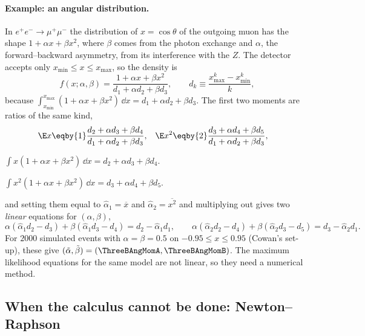 \paragraph{Example: an angular distribution.}
In $e^+e^-\to\mu^+\mu^-$ the distribution of $x=\cos\theta$ of the outgoing
muon has the shape $1+\alpha x+\beta x^2$, where $\beta$ comes from the
photon exchange and $\alpha$, the forward--backward asymmetry, from its
interference with the $Z$. The detector accepts only
$x_{\min}\le x\le x_{\max}$, so the density is
\begin{equation}
  f(x;\alpha,\beta)=\frac{1+\alpha x+\beta x^2}{d_1+\alpha d_2+\beta d_3},
  \qquad d_k\equiv\frac{x_{\max}^k-x_{\min}^k}{k},
  \label{3b:eq:angular}
\end{equation}
because
$\int_{x_{\min}}^{x_{\max}}(1+\alpha x+\beta x^2)\,\dd x=d_1+\alpha d_2+\beta d_3$.
The first two moments are ratios of the same kind,
\begin{align*}
  \E x&\eqby{1}\frac{d_2+\alpha d_3+\beta d_4}{d_1+\alpha d_2+\beta d_3},&
  \E x^2&\eqby{2}\frac{d_3+\alpha d_4+\beta d_5}{d_1+\alpha d_2+\beta d_3},
\end{align*}
\begin{explain}
  \item $\int x(1+\alpha x+\beta x^2)\,\dd x=d_2+\alpha d_3+\beta d_4$.
  \item $\int x^2(1+\alpha x+\beta x^2)\,\dd x=d_3+\alpha d_4+\beta d_5$.
\end{explain}
and setting them equal to $\hat\alpha_1=\overline{x}$ and
$\hat\alpha_2=\overline{x^2}$ and multiplying out gives two \emph{linear}
equations for $(\alpha,\beta)$,
\[
  \alpha(\hat\alpha_1d_2-d_3)+\beta(\hat\alpha_1d_3-d_4)=d_2-\hat\alpha_1d_1,
  \qquad
  \alpha(\hat\alpha_2d_2-d_4)+\beta(\hat\alpha_2d_3-d_5)=d_3-\hat\alpha_2d_1 .
\]
For $2000$ simulated events with $\alpha=\beta=0.5$ on
$-0.95\le x\le0.95$ (Cowan's set-up), these give
$(\tilde\alpha,\tilde\beta)=(\ThreeBAngMomA,\ThreeBAngMomB)$. The maximum
likelihood equations for the same model are not linear, so they need a
numerical method.

\subsection{When the calculus cannot be done: Newton--Raphson}
\label{3b:sec:newton}

